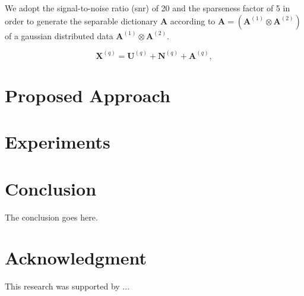 \documentclass[conference]{IEEEtran}
\begin{document}
We adopt the signal-to-noise ratio (snr) of 20 and the sparseness factor of 5 in order to generate the separable dictionary $\boldsymbol{A}$ according to $\boldsymbol{A} = (\boldsymbol{A}^{(1)} \otimes \boldsymbol{A}^{(2)})$ of a gaussian distributed data $\boldsymbol{A}^{(1)} \otimes \boldsymbol{A}^{(2)}$.



\begin{equation}\label{eq:eq04}
\boldsymbol{X}^{(q)} = \boldsymbol{U}^{(q)} + \boldsymbol{N}^{(q)} + \boldsymbol{A}^{(q)},
\end{equation}


\section{Proposed Approach}

\section{Experiments}

\section{Conclusion}
The conclusion goes here.


\section*{Acknowledgment}
{\small This research was supported by ...}




\end{document}

